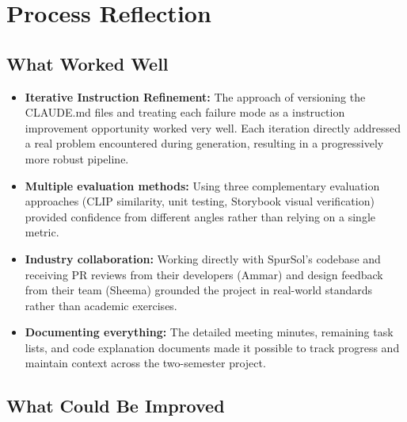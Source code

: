 
\section{Process Reflection}

\subsection{What Worked Well}

\begin{itemize}
    \item \textbf{Iterative Instruction Refinement:} The approach of versioning the CLAUDE.md files and treating each failure mode as a instruction improvement opportunity worked very well. Each iteration directly addressed a real problem encountered during generation, resulting in a progressively more robust pipeline.
    
    \item \textbf{Multiple evaluation methods:} Using three complementary evaluation approaches (CLIP similarity, unit testing, Storybook visual verification) provided confidence from different angles rather than relying on a single metric.
    
    \item \textbf{Industry collaboration:} Working directly with SpurSol's codebase and receiving PR reviews from their developers (Ammar) and design feedback from their team (Sheema) grounded the project in real-world standards rather than academic exercises.
    
    \item \textbf{Documenting everything:} The detailed meeting minutes, remaining task lists, and code explanation documents made it possible to track progress and maintain context across the two-semester project.
\end{itemize}

\subsection{What Could Be Improved}

